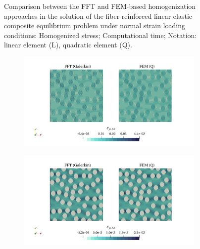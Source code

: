 \begin{figure}[hbt]
\begin{subfigure}[b]{0.49\textwidth}
      \caption{}
      \label{subfig:linear_2D_normal_stress_avg_cpu_time_vs_n_voxels}
    \end{subfigure}
  \caption{Comparison between the FFT and FEM-based homogenization approaches in the solution
  of the fiber-reinforced linear elastic composite equilibrium problem under normal strain
  loading conditions:  Homogenized
  stress;  Computational time;
  Notation: linear element (L), quadratic element (Q).}
\label{fig:linear_2D_normal_stiff_contrast}
\end{figure}

\begin{figure}[hbt]
  \centering
	\begin{subfigure}[b]{\textwidth}
    \centering
    \includegraphics[width=\textwidth]{figures/linear_2D_ratio_-4_normal_strain_11}
    \caption{}
    \label{subfig:linear_2D_ratio_-4_normal_strain_11}
  \end{subfigure}
  \begin{subfigure}[b]{\textwidth}
    \centering
    \includegraphics[width=\textwidth]{figures/linear_2D_ratio_4_normal_strain_11}

\end{subfigure}
\end{figure}
